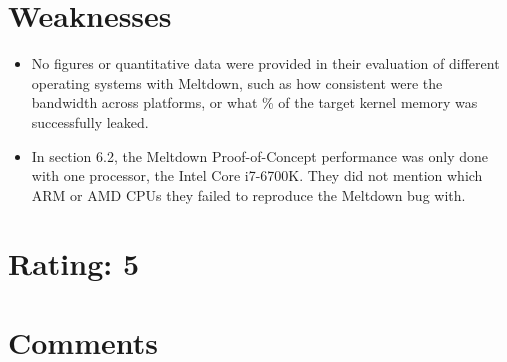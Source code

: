 \documentclass [12pt]{article}
\begin{document}
    \section{Weaknesses} %
    \label{sec:weaknesses}
        \begin{itemize}
            \item No figures or quantitative data were provided in their evaluation of different operating systems with Meltdown, such as how consistent were the bandwidth across platforms, or what \% of the target kernel memory was successfully leaked.
            \item In section 6.2, the Meltdown Proof-of-Concept performance was only done with one processor, the Intel Core i7-6700K. They did not mention which ARM or AMD CPUs they failed to reproduce the Meltdown bug with.
        \end{itemize}

    \section{Rating: 5} %
    \label{sec:rating}

    \section{Comments} %
    \label{sec:comments}
\end{document}
